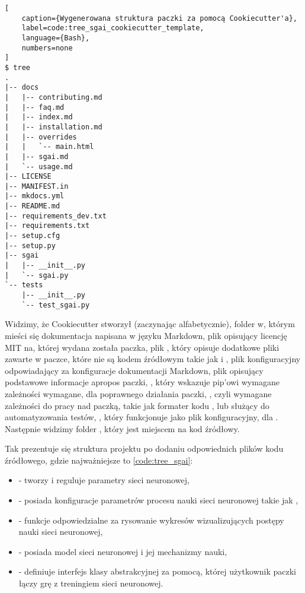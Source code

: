\begin{onepage}
    \begin{lstlisting}[
    caption={Wygenerowana struktura paczki za pomocą Cookiecutter'a},
    label=code:tree_sgai_cookiecutter_template,
    language={Bash},
    numbers=none
]
$ tree
.
|-- docs
|   |-- contributing.md
|   |-- faq.md
|   |-- index.md
|   |-- installation.md
|   |-- overrides
|   |   `-- main.html
|   |-- sgai.md
|   `-- usage.md
|-- LICENSE
|-- MANIFEST.in
|-- mkdocs.yml
|-- README.md
|-- requirements_dev.txt
|-- requirements.txt
|-- setup.cfg
|-- setup.py
|-- sgai
|   |-- __init__.py
|   `-- sgai.py
`-- tests
    |-- __init__.py
    `-- test_sgai.py
    \end{lstlisting}
\end{onepage}


Widzimy, że Cookiecutter stworzył (zaczynając alfabetycznie), folder  w, którym mieści się dokumentacja napisana w języku Markdown, plik  opisujący licencję MIT \cite{LicencjaMIT} na, której wydana została paczka, plik , który opisuje dodatkowe pliki zawarte w paczce, które nie są kodem źródłowym takie jak  i , plik konfiguracyjny  odpowiadający za konfiguracje dokumentacji Markdown, plik  opisujący podstawowe informacje apropos paczki, , który wskazuje pip'owi wymagane zależności wymagane, dla poprawnego działania paczki, , czyli wymagane zależności do pracy nad paczką, takie jak formater kodu , lub  służący do automatyzowania testów, , który funkcjonuje jako plik konfiguracyjny, dla .
Następnie widzimy folder , który jest miejscem na kod źródłowy.


\clearpage

Tak prezentuje się struktura projektu po dodaniu odpowiednich plików kodu źródłowego, gdzie najważniejsze to \ref{code:tree_sgai}:

\begin{itemize}
    \item {} - tworzy i reguluje parametry sieci neuronowej,
    \item {} - posiada konfiguracje parametrów procesu nauki sieci neuronowej takie jak ,
    \item {} - funkcje odpowiedzialne za rysowanie wykresów wizualizujących postępy nauki sieci neuronowej,
    \item {} - posiada model sieci neuronowej i jej mechanizmy nauki,
    \item {} - definiuje interfejs klasy abstrakcyjnej za pomocą, której użytkownik paczki łączy grę z treningiem sieci neuronowej.
\end{itemize}

